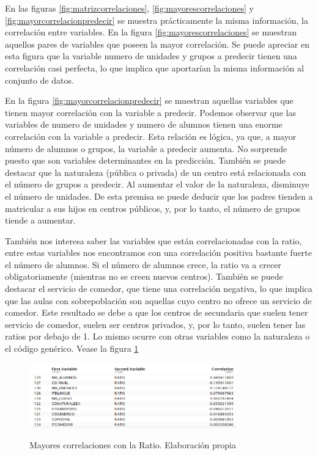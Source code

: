 En las figuras \ref{fig:matrizcorrelaciones}, \ref{fig:mayorescorrelaciones} y \ref{fig:mayorcorrelacionpredecir} se muestra prácticamente la misma información, la correlación entre variables. En la figura \ref{fig:mayorescorrelaciones} se muestran aquellos pares de variables que poseen la mayor correlación. Se puede apreciar en esta figura que la variable numero de unidades y grupos a predecir tienen una correlación casi perfecta, lo que implica que aportarían la misma información al conjunto de datos.

En la figura \ref{fig:mayorcorrelacionpredecir} se muestran aquellas variables que tienen mayor correlación con la variable a predecir. Podemos observar que las variables de numero de unidades y numero de alumnos tienen una enorme correlación con la variable a predecir. Esta relación es lógica, ya que, a mayor número de alumnos o grupos, la variable a predecir aumenta.  No sorprende puesto que son variables determinantes en la predicción. También se puede destacar que la naturaleza (pública o privada) de un centro está relacionada con el número de grupos a predecir. Al aumentar el valor de la naturaleza, disminuye el número de unidades. De esta premisa se puede deducir que los padres tienden a matricular a sus hijos en centros públicos, y, por lo tanto, el número de grupos tiende a aumentar. %

También nos interesa saber las variables que están correlacionadas con la ratio, entre estas variables nos encontramos con una correlación positiva bastante fuerte el número de alumnos. Si el número de alumnos crece, la ratio va a crecer obligatoriamente (mientras no se creen nuevos centros). También se puede destacar el servicio de comedor, que tiene una correlación negativa, lo que implica que las aulas con sobrepoblación son aquellas cuyo centro no ofrece un servicio de comedor. Este resultado se debe a que los centros de secundaria que suelen tener servicio de comedor, suelen ser centros privados, y, por lo tanto, suelen tener las ratios por debajo de 1. Lo mismo ocurre con otras variables como la naturaleza o el código genérico. Vease la figura \ref{fig:variablesRatio}

\begin{figure}[htb]
	\centering
	\caption{Mayores correlaciones con la Ratio. Elaboración propia}
	\includegraphics[width=0.8\textwidth]{recursos/ImagenesR/variablesRatio}
	\label{fig:variablesRatio}
\end{figure}
\FloatBarrier


